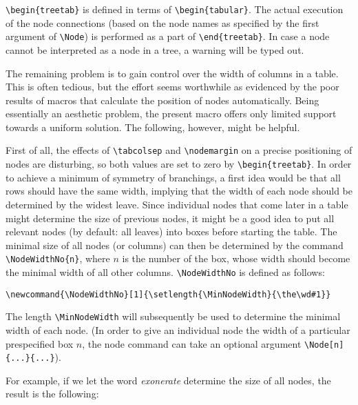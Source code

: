 \documentclass{article}
\begin{document}
\verb.\begin{treetab}. is defined in terms of \verb.\begin{tabular}..  
The actual execution of the node connections (based on the node names 
as specified by the first argument of \verb|\Node|) is performed as a part of 
\verb.\end{treetab}.. In case a node cannot be interpreted as a node 
in a tree, a warning will be typed out. 

The remaining problem is to gain control over the width of columns in 
a table.  This is often tedious, but the effort seems worthwhile as 
evidenced by the poor results of macros that calculate the position of 
nodes automatically.  Being essentially an aesthetic problem, the 
present macro offers only limited support towards a uniform solution.  
The following, however, might be helpful.

First of all, the effects of \verb.\tabcolsep.  and \verb.\nodemargin.  
on a precise positioning of nodes are disturbing, so both values are 
set to zero by \verb.\begin{treetab}..  In order to achieve a minimum 
of symmetry of branchings, a first idea would be that all rows should 
have the same width, implying that the width of each node should be 
determined by the widest leave.  Since individual nodes that come 
later in a table might determine the size of previous nodes, it might 
be a good idea to put all relevant nodes (by default: all leaves) into 
boxes before starting the table.  The minimal size of all nodes (or 
columns) can then be determined by the command \verb.\NodeWidthNo{n}., 
where $n$ is the number of the box, whose width should become the 
minimal width of all other columns.  \verb.\NodeWidthNo.  is defined 
as follows:
\begin{verbatim}
\newcommand{\NodeWidthNo}[1]{\setlength{\MinNodeWidth}{\the\wd#1}}	
\end{verbatim}
The length \verb|\MinNodeWidth| will subsequently be used to 
determine the minimal width of each node. (In order to give an 
individual node the width of a particular  prespecified box 
$n$, the node command can take an optional argument 
\verb|\Node[n]{...}{...}|).

For example, if we let the word \textit{exonerate} determine the size 
of all nodes, the result is the following:
\end{document}
